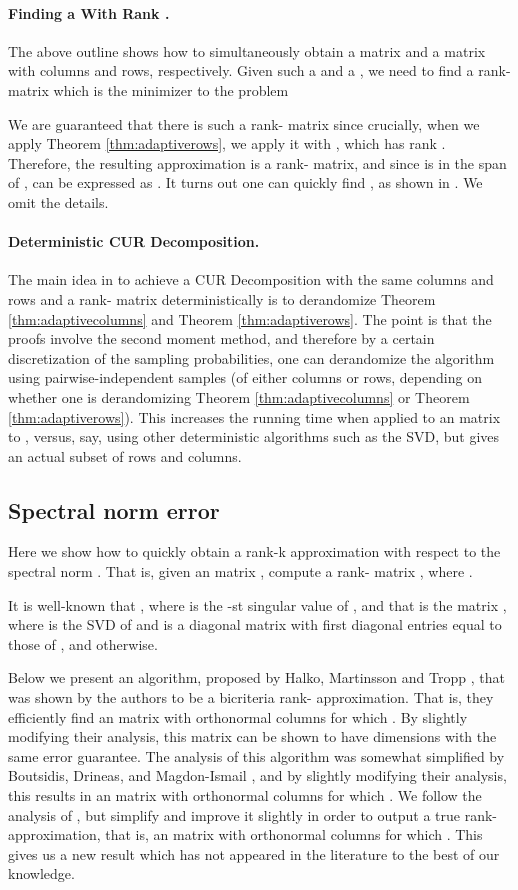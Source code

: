\documentclass[11pt]{article}
\begin{document}
\paragraph{Finding a  With Rank .}
The above outline shows how to simultaneously obtain a matrix  and a matrix  with  columns
and rows, respectively. Given such a  and a , we need to find a rank- matrix  which is the
minimizer to the problem

We are guaranteed that there is such a rank- matrix  since crucially, when we apply 
Theorem \ref{thm:adaptiverows}, we apply it with , which has rank . Therefore, the resulting
approximation  is a rank- matrix, and since  is in the span
of , can be expressed as . It turns out one can quickly find , as shown in \cite{BW14}. We omit the details. 

\paragraph{Deterministic CUR Decomposition.}
The main idea in \cite{BW14} 
to achieve a CUR Decomposition with the same  columns and rows and a rank- matrix 
deterministically is to derandomize Theorem \ref{thm:adaptivecolumns} and Theorem \ref{thm:adaptiverows}. The 
point is that the proofs involve the second moment method, and therefore by a certain discretization
of the sampling probabilities, one can derandomize the algorithm using pairwise-independent samples (of either columns
or rows, depending on whether one is derandomizing Theorem \ref{thm:adaptivecolumns} or Theorem \ref{thm:adaptiverows}). This
increases the running time when applied to an  matrix  to , 
versus, say,  using
other deterministic algorithms such as the SVD, but gives an actual subset of rows and columns. 

\subsection{Spectral norm error}\label{sec:spectral}
Here we show how to quickly obtain a  rank-k approximation with respect to the spectral norm
. That is, given an  matrix , compute a rank-
matrix , where . 

It is well-known that , where  is the -st singular
value of , 
and that  is the matrix , where  is the SVD of  and
 is a diagonal matrix with first  diagonal entries equal to those of , and  otherwise. 

Below we present an algorithm, proposed by Halko, Martinsson and Tropp \cite{HMT}, that was shown 
by the authors to be a bicriteria
rank- approximation. That is, they efficiently find an  matrix  with orthonormal columns for which
 . By slightly modifying their analysis, 
this matrix  can be shown to have dimensions  with the same error 
guarantee. 
The analysis of this algorithm was somewhat simplified by
Boutsidis, Drineas, and Magdon-Ismail \cite{BDM11a}, and by slightly modifying their analysis, this results in an 
 matrix  with orthonormal
columns for which . 
We follow the analysis of \cite{BDM11a}, but 
simplify and improve it slightly in order to output 
a true rank- approximation, that is, an  matrix  with orthonormal columns for which 
. This gives us a new result
which has not appeared in the literature to the best of our knowledge. 
\end{document}
